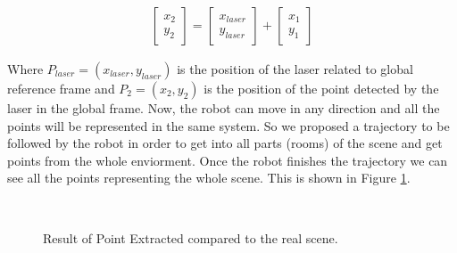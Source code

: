 \documentclass[twoside,conference,a4paper]{IEEEtran}
\begin{document}
\begin{gather}
 \begin{bmatrix} x_{2} \\ y_{2} \end{bmatrix}
 =
   \begin{bmatrix} x_{laser} \\ y_{laser} \end{bmatrix}  
   +
   \begin{bmatrix} x_{1} \\ y_{1} \end{bmatrix}
\end{gather}

Where $ P_{laser} = (x_{laser}, y_{laser}) $ is the position of the laser related to global reference frame and $ P_{2} = (x_{2}, y_{2}) $ is the position of the point detected by the laser in the global frame. Now, the robot can move in any 
direction and all the points will be represented in the same system. So we proposed a trajectory to be followed by the 
robot in order to get into all parts (rooms) of the scene and get points from the whole enviorment. Once the robot 
finishes the trajectory we can see all the points representing the whole scene. This is shown in Figure \ref{fig:Points_Extraction}. 

\begin{figure}[h]
\begin{center}
{} \hspace{0.1cm}
 \\
\caption{Result of Point Extracted compared to the real scene.}
\label{fig:Points_Extraction}
\end{center}
\end{figure}
\end{document}
